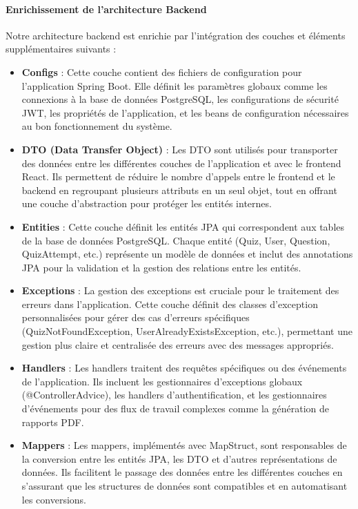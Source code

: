 \documentclass[12pt,a4paper]{report}
\begin{document}
\paragraph{Enrichissement de l'architecture Backend}

Notre architecture backend est enrichie par l'intégration des couches et éléments supplémentaires suivants :

\begin{itemize}
\item \textbf{Configs} : Cette couche contient des fichiers de configuration pour l'application Spring Boot. Elle définit les paramètres globaux comme les connexions à la base de données PostgreSQL, les configurations de sécurité JWT, les propriétés de l'application, et les beans de configuration nécessaires au bon fonctionnement du système.

\item \textbf{DTO (Data Transfer Object)} : Les DTO sont utilisés pour transporter des données entre les différentes couches de l'application et avec le frontend React. Ils permettent de réduire le nombre d'appels entre le frontend et le backend en regroupant plusieurs attributs en un seul objet, tout en offrant une couche d'abstraction pour protéger les entités internes.

\item \textbf{Entities} : Cette couche définit les entités JPA qui correspondent aux tables de la base de données PostgreSQL. Chaque entité (Quiz, User, Question, QuizAttempt, etc.) représente un modèle de données et inclut des annotations JPA pour la validation et la gestion des relations entre les entités.

\item \textbf{Exceptions} : La gestion des exceptions est cruciale pour le traitement des erreurs dans l'application. Cette couche définit des classes d'exception personnalisées pour gérer des cas d'erreurs spécifiques (QuizNotFoundException, UserAlreadyExistsException, etc.), permettant une gestion plus claire et centralisée des erreurs avec des messages appropriés.

\item \textbf{Handlers} : Les handlers traitent des requêtes spécifiques ou des événements de l'application. Ils incluent les gestionnaires d'exceptions globaux (@ControllerAdvice), les handlers d'authentification, et les gestionnaires d'événements pour des flux de travail complexes comme la génération de rapports PDF.

\item \textbf{Mappers} : Les mappers, implémentés avec MapStruct, sont responsables de la conversion entre les entités JPA, les DTO et d'autres représentations de données. Ils facilitent le passage des données entre les différentes couches en s'assurant que les structures de données sont compatibles et en automatisant les conversions.


\end{itemize}
\end{document}
